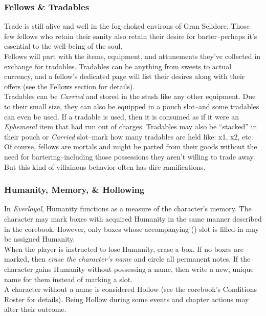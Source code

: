 \documentclass[12pt]{article}
\begin{document}
\begin{multicols*}{2}
\subsubsection{Fellows \& Tradables}
Trade is still alive and well in the fog-choked environs of Gran Selidore. Those few fellows who retain their sanity also retain their desire for barter--perhaps it’s essential to the well-being of the soul.\\
Fellows will part with the items, equipment, and attunements they’ve collected in exchange for tradables. Tradables can be anything from sweets to actual currency, and a fellow’s dedicated page will list their desires along with their offers (see the Fellows section for details).\\
Tradables can be \emph{Carried} and stored in the stash like any other equipment. Due to their small size, they can also be equipped in a pouch slot--and some tradables can even be used. If a tradable is used, then it is consumed as if it were an \emph{Ephemeral} item that had run out of charges. Tradables may also be “stacked” in their pouch or \emph{Carried} slot--mark how many tradables are held like: x1, x2, etc.\\
Of course, fellows are mortals and might be parted from their goods without the need for bartering--including those possessions they aren’t willing to trade away. But this kind of villainous behavior often has dire ramifications.

\subsubsection{Humanity, Memory, \& Hollowing}
\hypertarget{HMN}{}\hypertarget{MEM}{}
In \emph{Everloyal}, Humanity functions as a measure of the character’s memory. The character may mark  boxes with acquired Humanity in the same manner described in the corebook. However, only  boxes whose accompanying  () slot is filled-in may be assigned Humanity.\\
When the player is instructed to lose Humanity, erase a  box. If no  boxes are marked, then \emph{erase the character’s name} and circle all permanent notes. If the character gains Humanity without possessing a name, then write a new, unique name for them instead of marking a  slot.\\
A character without a name is considered Hollow (see the corebook’s Conditions Roster for details). Being Hollow during some events and chapter actions may alter their outcome.


\end{multicols*}
\end{document}
